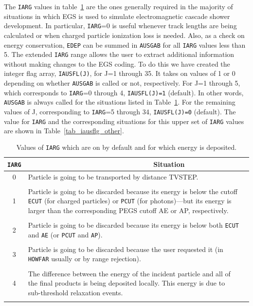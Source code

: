 The {\tt IARG} values in table~\ref{tab_iausfl_low} are the ones
generally required in the majority of situations in which EGS is used
to simulate electromagnetic cascade shower development.  In particular,
{\tt IARG}=0 is useful whenever track lengths are being calculated or when
charged particle ionization loss is needed.  Also, as a check on energy
conservation, {\tt EDEP} can be summed in {\tt AUSGAB} for all {\tt IARG}
values less than 5.  The extended {\tt IARG} range allows the user to
extract additional information without making changes to the EGS coding.
To do this we have created the integer flag array, {\tt IAUSFL(J)},
for J=1 through 35.  It takes on values of 1 or 0 depending on whether
{\tt AUSGAB} is called or not, respectively.  For J=1 through 5, which
corresponds to {\tt IARG}=0 through 4, {\tt IAUSFL(J)=1} (default).
In other words, {\tt AUSGAB} is always called for the situations
listed in Table~\ref{tab_iausfl_low}.  For the remaining values of J,
corresponding to {\tt IARG}=5 through 34, {\tt IAUSFL(J)=0} (default).
The value for {\tt IARG} and the corresponding situations for this upper
set of {\tt IARG} values are shown in Table~\ref{tab_iausflg_other}.
    \begin{table}[hbt]
    \begin{center}
\caption{Values of {\tt IARG} which are on by default and for which energy is
deposited.}
    \label{tab_iausfl_low}
\vspace*{4mm}
    \begin{tabular}{ c   p{135mm}l  |}
    \hline
    {\tt IARG} & ~~~~~~~~~~~~~~~~~~~~~~~~~~~~~~~~Situation \\
    \hline
0	& Particle is going to be transported by distance TVSTEP.\\
    &\\
1	&Particle is going to be discarded because its energy is below the
cutoff {\tt ECUT} (for charged particles) or {\tt PCUT} (for photons)---but its energy
is larger than the corresponding PEGS cutoff AE or AP, respectively.\\
    &\\
2	& Particle is going to be discarded because its energy is below
both {\tt ECUT} and {\tt AE} (or {\tt PCUT} and {\tt AP}).\\
	&\\
3	& Particle is going to be discarded because the user requested it
(in {\tt HOWFAR} usually or by range rejection).  \\
	&\\
4	&The difference between the energy of the incident particle and
         all of the final products is being deposited locally. This
         energy is  due to sub-threshold relaxation events.\\
	&\\
\hline
\end{tabular}
\end{center}
\end{table}

